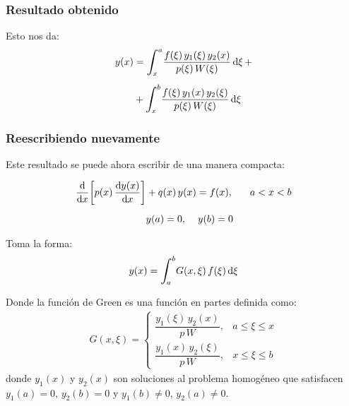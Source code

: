 \documentclass[12pt]{beamer}
\begin{document}
\begin{frame}
\frametitle{Resultado obtenido}
Esto nos da:
\pause
\begin{eqnarray}
\begin{aligned}
y (x) &= \scaleint{6ex}_{\bs x}^{a} \dfrac{f (\xi) \, y_{1} (\xi) \, y_{2} (x)}{p (\xi) \, W (\xi)} \dd{\xi} + \\[0.5em]
&+\scaleint{6ex}_{\bs x}^{b} \dfrac{f (\xi) \, y_{1} (x) \, y_{2} (\xi)}{p (\xi) \, W (\xi)} \dd{\xi}
\end{aligned}
\label{eq:ecuacion_07_30}
\end{eqnarray}
\end{frame}

\begin{frame}
\frametitle{Reescribiendo nuevamente}
Este resultado se puede ahora escribir de una manera compacta:
\end{frame}

\begin{frame}[plain]
\begin{tcolorbox}[title={\centering Solución para problema de CDF con la función de Green}]
\begin{align}
\begin{aligned}
\dv{x} \bigg[ p (x) \, \dv{y (x)}{x} \bigg] &+ q (x) \, y (x) = f (x), \hspace{0.6cm} a < x < b \\[0.5em]
&y (a) = 0, \hspace{0.4cm} y (b) = 0
\end{aligned}
\label{eq:ecuacion_07_31}
\end{align}
\end{tcolorbox}
\end{frame}

\begin{frame}[plain]
\begin{tcolorbox}[title={\centering Solución para problema de CDF con la función de Green}]
Toma la forma:
\begin{align}
y (x) = \scaleint{6ex}_{\bs a}^{b} G (x, \xi) \, f (\xi) \dd{\xi}
\label{eq:ecuacion_07_32}
\end{align}

\end{tcolorbox}
\end{frame}

\begin{frame}[plain]
\begin{tcolorbox}[title={\centering Solución para problema de CDF con la función de Green}]
Donde la función de Green es una función en partes definida como:
\begin{align}
G (x, \xi) = \begin{cases}
\dfrac{y_{1} (\xi) \, y_{2} (x)}{p \, W}, & a \leq \xi \leq x \\[0.5em]
\dfrac{y_{1} (x) \, y_{2} (\xi)}{p \, W}, & x \leq \xi \leq b
\end{cases}
\label{eq:ecuacion_07_33}
\end{align}
donde $y_{1} (x)$ y $y_{2} (x)$ son soluciones al problema homogéneo que satisfacen $y_{1} (a) = 0$, $y_{2} (b) = 0$ y $y_{1} (b) \neq 0$, $y_{2} (a) \neq 0$.
\end{tcolorbox}
\end{frame}
\end{document}

